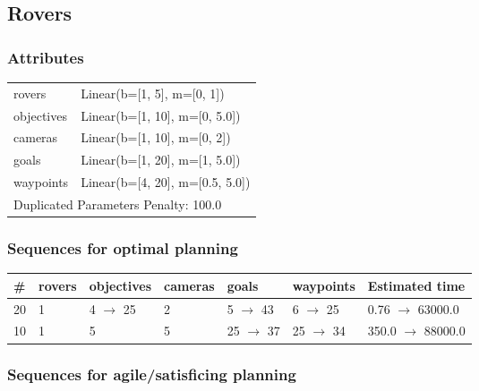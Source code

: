 \documentclass{article}
\begin{document}
                            \newpage \subsection{Rovers}
                    \subsubsection*{Attributes}
                    \begin{tabular}{@{}p{}p{}@{}}
                    \toprule
                    rovers & Linear(b=[1, 5], m=[0, 1])\\
objectives & Linear(b=[1, 10], m=[0, 5.0])\\
cameras & Linear(b=[1, 10], m=[0, 2])\\
goals & Linear(b=[1, 20], m=[1, 5.0])\\
waypoints & Linear(b=[4, 20], m=[0.5, 5.0]) \\
                    \bottomrule
                    \multicolumn{2}{l}{Duplicated Parameters Penalty: 100.0}
                    \end{tabular}
                
                            \subsubsection*{Sequences for optimal planning}

                            \begin{center}
                            \begin{tabular}{@{}l|l|l|l|l|l|l@{}}
                            \# & rovers & objectives & cameras & goals & waypoints & Estimated time\\\midrule
                            20&1&4 $\rightarrow$ 25&2&5 $\rightarrow$ 43&6 $\rightarrow$ 25&0.76 $\rightarrow$ 63000.0\\
10&1&5&5&25 $\rightarrow$ 37&25 $\rightarrow$ 34&350.0 $\rightarrow$ 88000.0
                            \end{tabular}
                            \end{center}
                    
                         \subsubsection*{Sequences for agile/satisficing planning}
\end{document}
